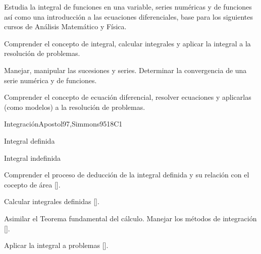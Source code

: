 \begin{syllabus}


\begin{justification}
Estudia la integral de funciones en una variable, series numéricas y de funciones así como una introducción a las ecuaciones diferenciales, base para los siguientes cursos de Análisis Matemático y Física.
\end{justification}

\begin{goals}
\item Comprender el concepto de integral, calcular integrales y aplicar la integral a la resolución de problemas.
\item Manejar, manipular las sucesiones y series. Determinar la convergencia de una serie numérica y de funciones.
\item Comprender el concepto de ecuación diferencial, resolver ecuaciones y aplicarlas (como modelos) a la resolución de problemas.
\end{goals}

\begin{outcomes}
    \item {}
    \item {}
\end{outcomes}

\begin{competences}
    \item {} 
    \item {} 
    \item {} 
\end{competences}

\begin{unit}{}{Integración}{Apostol97,Simmons95}{18}{C1}
   \begin{topics}
      \item Integral definida
      \item Integral indefinida
   \end{topics}

   \begin{learningoutcomes}
      \item Comprender el proceso de deducción de la integral definida y su relación con el cocepto de área [\Usage].
      \item Calcular integrales definidas [\Usage].
      \item Asimilar el Teorema fundamental del cálculo. Manejar los métodos de integración [\Usage].
      \item Aplicar la integral a problemas [\Usage].
   \end{learningoutcomes}
\end{unit}


\end{syllabus}
